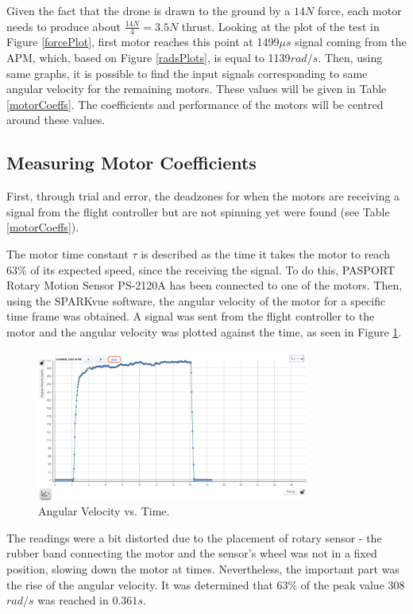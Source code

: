 Given the fact that the drone is drawn to the ground by a $14N$ force, each motor needs to produce about $\frac{14N}{4} = 3.5N$ thrust. Looking at the plot of the test in Figure \ref{forcePlot}, first motor reaches this point at 1499$\mu s$ signal coming from the APM, which, based on Figure \ref{radsPlots}, is equal to 1139$rad/s$. Then, using same graphs, it is possible to find the input signals corresponding to same angular velocity for the remaining motors. These values will be given in Table \ref{motorCoeffs}.
The coefficients and performance of the motors will be centred around these values.

\subsection{Measuring Motor Coefficients}
First, through trial and error, the deadzones for when the motors are receiving a signal from the flight controller but are not spinning yet were found (see Table \ref{motorCoeffs}).

The motor time constant $\tau$ is described as the time it takes the motor to reach 63\% of its expected speed, since the receiving the signal. To do this, PASPORT Rotary Motion Sensor PS-2120A has been connected to one of the motors. Then, using the SPARKvue software, the angular velocity of the motor for a specific time frame was obtained. A signal was sent from the flight controller to the motor and the angular velocity was plotted against the time, as seen in Figure \ref{timeconstant}.

\begin{figure}[H]
  \centering
    \includegraphics[width=0.8\textwidth]{images/timeconstant.png}
	\caption{Angular Velocity vs. Time.}
	\label{timeconstant}
\end{figure}

The readings were a bit distorted due to the placement of rotary sensor - the rubber band connecting the motor and the sensor's wheel was not in a fixed position, slowing down the motor at times. Nevertheless, the important part was the rise of the angular velocity. It was determined that 63\% of the peak value 308$rad/s$ was reached in $0.361s$.

